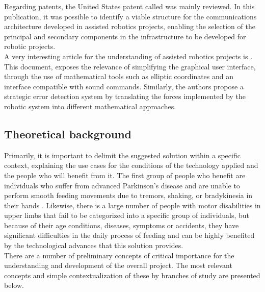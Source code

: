 \documentclass[11pt]{report} %
\begin{document}
Regarding patents, the United States patent called  \citep{cite_patent_mobile_human_friendly_assistive_robot} was mainly reviewed. In this publication, it was possible to identify a viable structure for the communications architecture developed in assisted robotics projects, enabling the selection of the principal and secondary components in the infrastructure to be developed for robotic projects.\\


A very interesting article for the understanding of assisted robotics projects is  \citep{cite_robot_for_humanity_empower_people_with_disabilities}. This document, exposes the relevance of simplifying the graphical user interface, through the use of mathematical tools such as elliptic coordinates and an interface compatible with sound commands. Similarly, the authors propose a strategic error detection system by translating the forces implemented by the robotic system into different mathematical approaches.\\


\subsection{Theoretical background}

Primarily, it is important to delimit the suggested solution within a specific context, explaining the use cases for the conditions of the technology applied and the people who will benefit from it. The first group of people who benefit are individuals who suffer from advanced Parkinson's disease and are unable to perform smooth feeding movements due to tremors, shaking, or bradykinesia in their hands \citep{cite_parkinsons_disease_symptomps_mayo_clinic}. Likewise, there is a large number of people with motor disabilities in upper limbs that fail to be categorized into a specific group of individuals, but because of their age conditions, diseases, symptoms or accidents, they have significant difficulties in the daily process of feeding and can be highly benefited by the technological advances that this solution provides.\\

There are a number of preliminary concepts of critical importance for the understanding and development of the overall project. The most relevant concepts and simple contextualization of these by branches of study are presented below.\\
\end{document}
